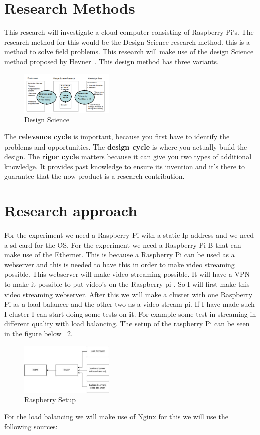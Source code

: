\documentclass{sig-alternate-br}
\begin{document}
\section{Research Methods}
This research will investigate a cloud computer consisting of Raspberry Pi's. The research method for this would be the Design Science research method. this is a method to solve field problems. This research will make use of the design Science method proposed by Hevner~\cite{hevner:2007}. This design method has three variants. 
\begin{figure}[H]
	\centering 
	\includegraphics[width=0.4\textwidth]{Design_science.png}
	\caption{Design Science}
	\label{fig:design} %
\end{figure}
The \textbf{relevance cycle} is important, because you first have to identify the problems and opportunities. The \textbf{design cycle} is where you actually build the design. The \textbf{rigor cycle} matters because it can give you two types of additional knowledge. It provides past knowledge to ensure its invention and it's there to guarantee that the now product is a research contribution.

\section{Research approach}
For the experiment we need a Raspberry Pi with a static Ip address and we need a sd card for the OS. For the experiment we need a Raspberry Pi B that can make use of the Ethernet. This is because a Raspberry Pi can be used as a webserver and this is needed to have this in order to make video streaming possible. This webserver will make video streaming possible. It will have a VPN to make it possible to put video's on the Raspberry pi \cite{VPN:2014}. 
So I will first make this video streaming webserver. 
After this we will make a cluster with one Raspberry Pi as a load balancer and the other two as a video stream pi. If I have made such I cluster I can start doing some tests on it. For example some test in streaming in different quality with load balancing. The setup of the raspberry Pi can be seen in the figure below ~\ref{fig:setup}.

\begin{figure}[H]
\centering 
\includegraphics[width=0.4\textwidth]{raspberry pi setup.jpg}
\caption{Raspberry Setup}
\label{fig:setup} %
\end{figure}
For the load balancing we will make use of Nginx for this we will use the following sources:
\cite{nginx-load-balancing, nginx-load-balancing-2}
\end{document}
